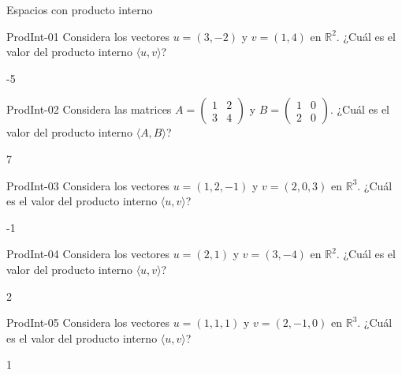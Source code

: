 \documentclass[a4,11pt]{aleph-notas}
\begin{document}
\begin{quiz}{Espacios con producto interno}

\begin{numerical}[tolerance=0]%
    {ProdInt-01}
    Considera los vectores \( u = (3, -2) \) y \( v = (1, 4) \) en \( \mathbb{R}^2 \). ¿Cuál es el valor del producto interno \( \langle u , v\rangle \)?
    \item -5
\end{numerical}

\begin{numerical}[tolerance=0]%
    {ProdInt-02}
     Considera las matrices \( A = \begin{pmatrix} 1 & 2 \\ 3 & 4 \end{pmatrix} \) y \( B = \begin{pmatrix} 1 & 0 \\ 2 & 0 \end{pmatrix} \). 
     ¿Cuál es el valor del producto interno \( \langle A , B\rangle \)?
    \item 7
\end{numerical}

\begin{numerical}[tolerance=0]%
    {ProdInt-03}
    Considera los vectores \(u=(1,2,-1)\) y \(v=(2,0,3)\) en \(\mathbb{R}^3\). ¿Cuál es el valor del producto interno \(\langle u,v\rangle\)?
    \item -1
\end{numerical}

\begin{numerical}[tolerance=0]%
    {ProdInt-04}
    Considera los vectores \(u=(2,1)\) y \(v=(3,-4)\) en \(\mathbb{R}^2\). ¿Cuál es el valor del producto interno \(\langle u,v\rangle\)?
    \item 2
\end{numerical}

\begin{numerical}[tolerance=0]%
    {ProdInt-05}
    Considera los vectores \(u=(1,1,1)\) y \(v=(2,-1,0)\) en \(\mathbb{R}^3\). ¿Cuál es el valor del producto interno \(\langle u,v\rangle\)?
    \item 1
\end{numerical}


\end{quiz}
\end{document}
